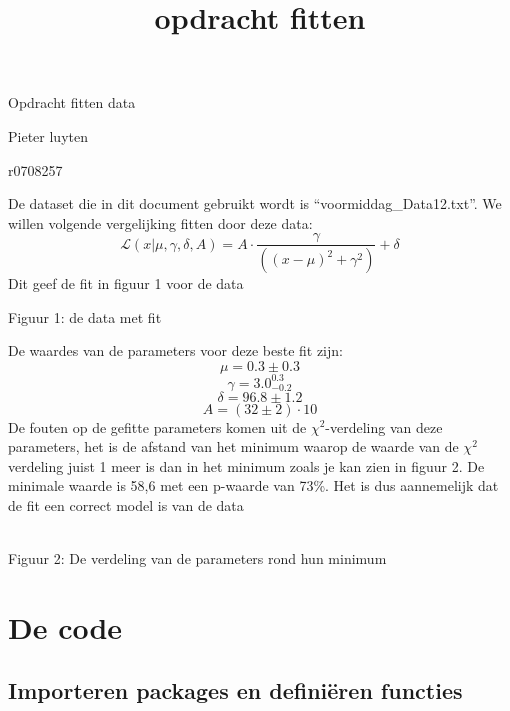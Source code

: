 \documentclass[11pt]{article}
\title{opdracht fitten}
\begin{document}
    
    
    \maketitle
    
    

    
    Opdracht fitten data

Pieter luyten

r0708257

    De dataset die in dit document gebruikt wordt is
``voormiddag\_Data12.txt''. We willen volgende vergelijking fitten door
deze data:
\[\mathcal{L}(x|\mu, \gamma, \delta, A) = A \cdot \frac{\gamma}{\left( \left(x-\mu \right)^2 + \gamma^2 \right)} + \delta\]
Dit geef de fit in figuur 1 voor de data

    \begin{center}
    Figuur 1: de data met fit
    \end{center}
\newpage
    

    De waardes van de parameters voor deze beste fit zijn:
\[\mu = 0.3 \pm 0.3\] \[\gamma = 3.0_{-0.2}^{0.3}\]
\[\delta = 96.8 \pm 1.2\] \[A = (32 \pm 2) \cdot 10\] De fouten op de
gefitte parameters komen uit de \(\chi^2\)-verdeling van deze
parameters, het is de afstand van het minimum waarop de waarde van de
\(\chi^2\) verdeling juist 1 meer is dan in het minimum zoals je kan
zien in figuur 2. De minimale waarde is 58,6 met een p-waarde van 73\%.
Het is dus aannemelijk dat de fit een correct model is van de data
    \begin{center}
    \\
    Figuur 2: De verdeling van de parameters rond hun minimum
    \end{center}
    

    \hypertarget{de-code}{%
\section{De code}\label{de-code}}

    \hypertarget{importeren-packages-en-definiuxebren-functies}{%
\subsection{Importeren packages en definiëren
functies}\label{importeren-packages-en-definiuxebren-functies}}
\end{document}
